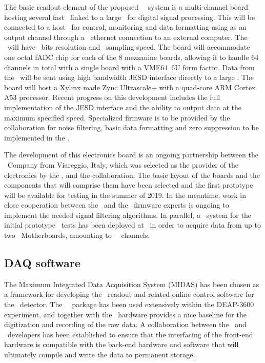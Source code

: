 The basic readout element of the proposed \DSks\ \DAQ\ system is a multi-channel board hosting several fast \ADCs\ linked to a large \FPGA\ for digital signal processing.  This will be connected to a host \CPU\ for control, monitoring and data formatting using as an output channel through a \DSkDAQEthernetRate\ ethernet connection to an external computer.  The \ADC\ will have \DSkDAQADCBits\ bits resolution and \DSkDAQADCSamplingRate\ sampling speed.  The board will accommodate one octal fADC chip for each of the \num{8} mezzanine boards, allowing if to handle 64 channels in total with a single board with a VME64~6U form factor.  Data from the \ADCs\ will be sent using high bandwidth JESD interface directly to a large \FPGA.  The board will host a Xylinx made Zync Ultrascale+ with a quad-core ARM Cortex A53 processor.  Recent progress on this development includes the full implementation of the JESD interface and the ability to output data at the maximum specified speed.  Specialized firmware is to be provided by the collaboration for noise filtering, basic data formatting and zero suppression to be implemented in the \FPGA.

The development of this electronics board is an ongoing partnership between  the \CAEN\ Company from Viareggio, Italy, which was selected as the provider of the electronics by the \INFN, and the collaboration.  The basic layout of the boards and the components that will comprise them have been selected and the first prototype will be available for testing in the summer of 2019.  In the meantime, work in close cooperation between the \GADMC\ and the \CAEN\ firmware experts is ongoing to implement the needed signal filtering algorithms.  In parallel, a \DAQ\ system for the initial prototype \TPC\ tests has been deployed at \CERN\ in order to acquire data from up to two \DSkPdm\ Motherboards, amounting to \DSpZeroPdmsNumber\ \DSkPdm\ channels.


\subsection{DAQ software}

The Maximum Integrated Data Acquisition System (MIDAS) has been chosen as a framework for developing the \DAQ\ readout and related online control software for the \DSks\ detector.  The \MIDAS\ \DAQ\ package has been used extensively within the DEAP-3600 experiment, and together with the \CAEN\ hardware provides a nice baseline for the digitization and recording of the raw data. A collaboration between the \MIDAS\ and \CAEN\ developers has been established to ensure that the interfacing of the front-end hardware is compatible with the back-end hardware and software that will ultimately compile and write the data to permanent storage.


